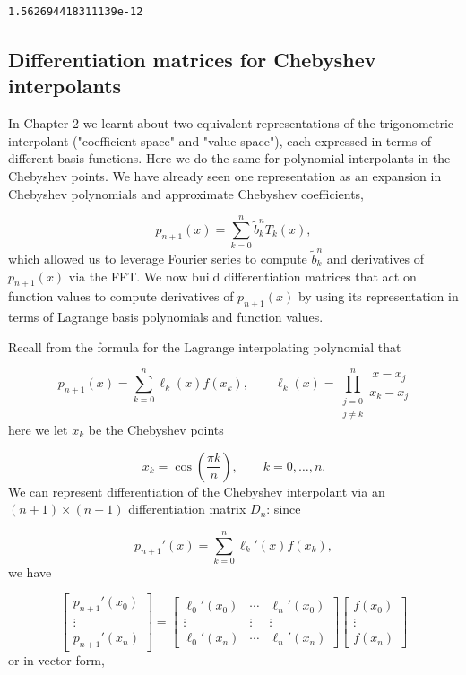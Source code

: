 \documentclass[12pt,a4paper]{article}
\begin{document}
\begin{lstlisting}
1.562694418311139e-12
\end{lstlisting}


\subsection{Differentiation matrices for Chebyshev interpolants}
In Chapter 2 we learnt about two equivalent representations of the trigonometric interpolant ("coefficient space" and "value space"), each expressed in terms of different basis functions.  Here we do the same for polynomial interpolants in the Chebyshev points. We have already seen one representation as an expansion in Chebyshev polynomials and approximate Chebyshev coefficients,

\[
p_{n+1}(x) = \sum_{k = 0}^{n}\tilde{b}_k^n T_k(x),
\]
which allowed us to leverage Fourier series to compute $\tilde{b}_k^n$ and derivatives of $p_{n+1}(x)$ via the FFT.  We now build differentiation matrices that act on function values to compute derivatives of $p_{n+1}(x)$ by using its representation in terms of Lagrange basis polynomials and function values.

Recall from the formula for the Lagrange interpolating polynomial that

\[
p_{n+1}(x) = \sum_{k = 0}^{n}\ell_k(x)f(x_k), \qquad \ell_k(x) = \prod_{\substack{j=0\\ j \neq k}}^{n}\frac{x-x_j}{x_k-x_j}
\]
here we let $x_k$ be the Chebyshev points 

\[
x_k = \cos\left(\frac{\pi k}{n} \right), \qquad k = 0, \ldots, n.
\]
We can represent differentiation of the Chebyshev interpolant via an $(n+1) \times (n+1)$ differentiation matrix $D_n$: since

\[
p_{n+1}'(x) = \sum_{k = 0}^{n}\ell_k'(x)f(x_k),
\]
we have

\[
\begin{bmatrix}
p_{n+1}'(x_0) \\
\vdots \\
p_{n+1}'(x_n)
\end{bmatrix} = 
\begin{bmatrix}
\ell_0'(x_0) & \cdots & \ell_n'(x_0) \\
\vdots & \vdots  & \vdots \\
\ell_0'(x_n) & \cdots & \ell_n'(x_n)
\end{bmatrix}
\begin{bmatrix}
f(x_0) \\
\vdots \\
f(x_n)
\end{bmatrix}
\]
or in vector form,
\end{document}
